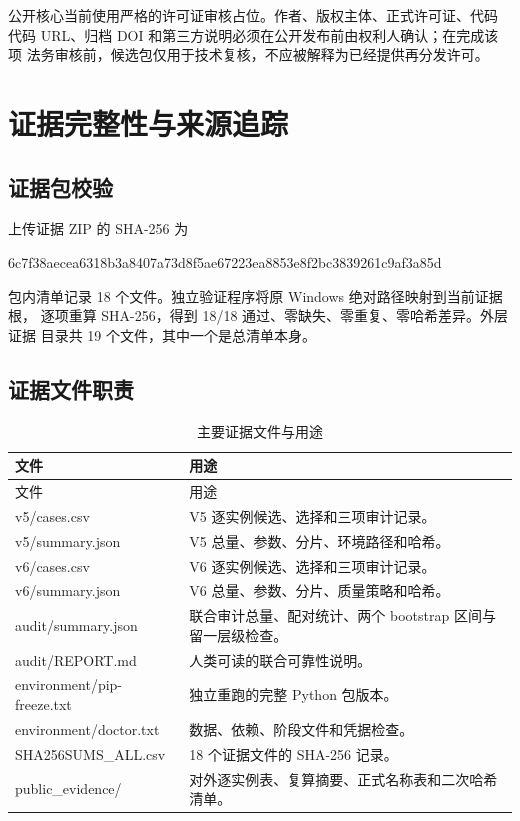 \documentclass[11pt,a4paper]{article}
\begin{document}
公开核心当前使用严格的许可证审核占位。作者、版权主体、正式许可证、代码
代码 URL、归档 DOI 和第三方说明必须在公开发布前由权利人确认；在完成该项
法务审核前，候选包仅用于技术复核，不应被解释为已经提供再分发许可。

\section{证据完整性与来源追踪}

\subsection{证据包校验}

上传证据 ZIP 的 SHA-256 为

\begin{center}
\small\ttfamily
6c7f38aecea6318b3a8407a73d8f5ae67223ea8853e8f2bc3839261c9af3a85d
\end{center}

包内清单记录 18 个文件。独立验证程序将原 Windows 绝对路径映射到当前证据根，
逐项重算 SHA-256，得到 18/18 通过、零缺失、零重复、零哈希差异。外层证据
目录共 19 个文件，其中一个是总清单本身。

\subsection{证据文件职责}

\begin{longtable}{p{}p{}}
\caption{主要证据文件与用途}\\
\toprule
文件 & 用途 \\
\midrule
\endfirsthead
\toprule
文件 & 用途 \\
\midrule
\endhead
v5/cases.csv & V5 逐实例候选、选择和三项审计记录。\\
v5/summary.json & V5 总量、参数、分片、环境路径和哈希。\\
v6/cases.csv & V6 逐实例候选、选择和三项审计记录。\\
v6/summary.json & V6 总量、参数、分片、质量策略和哈希。\\
audit/summary.json & 联合审计总量、配对统计、两个 bootstrap 区间与留一层级检查。\\
audit/REPORT.md & 人类可读的联合可靠性说明。\\
environment/pip-freeze.txt & 独立重跑的完整 Python 包版本。\\
environment/doctor.txt & 数据、依赖、阶段文件和凭据检查。\\
SHA256SUMS\_ALL.csv & 18 个证据文件的 SHA-256 记录。\\
public\_evidence/ & 对外逐实例表、复算摘要、正式名称表和二次哈希清单。\\
\bottomrule
\end{longtable}
\end{document}

